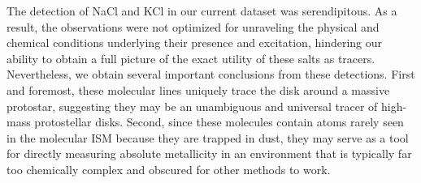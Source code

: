 \documentclass[12pt]{article}
\begin{document}
The detection of NaCl and KCl in our current dataset was serendipitous.  As a
result, the observations were not optimized for unraveling the physical and
chemical conditions underlying their presence and excitation, hindering our
ability to obtain a full picture of the exact utility of these salts as
tracers.  Nevertheless, we obtain several important conclusions from these
detections.  First and foremost, these molecular lines uniquely trace the disk
around a massive protostar, suggesting they may be an unambiguous and universal
tracer of high-mass protostellar disks. Second, since these molecules contain
atoms rarely seen in the molecular ISM because they are trapped in dust, they
may serve as a tool for directly measuring absolute metallicity in an
environment that is typically far too chemically complex and obscured for other
methods to work.
\end{document}
